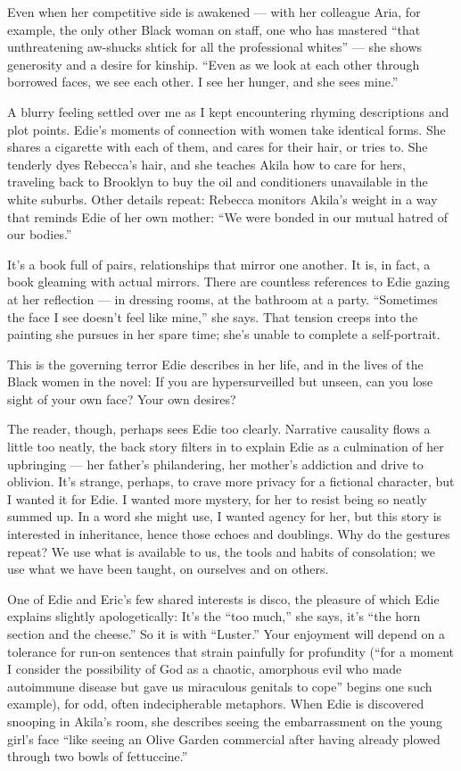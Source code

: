 Even when her competitive side is awakened --- with her colleague Aria,
for example, the only other Black woman on staff, one who has mastered
``that unthreatening aw-shucks shtick for all the professional whites''
--- she shows generosity and a desire for kinship. ``Even as we look at
each other through borrowed faces, we see each other. I see her hunger,
and she sees mine.''

A blurry feeling settled over me as I kept encountering rhyming
descriptions and plot points. Edie's moments of connection with women
take identical forms. She shares a cigarette with each of them, and
cares for their hair, or tries to. She tenderly dyes Rebecca's hair, and
she teaches Akila how to care for hers, traveling back to Brooklyn to
buy the oil and conditioners unavailable in the white suburbs. Other
details repeat: Rebecca monitors Akila's weight in a way that reminds
Edie of her own mother: ``We were bonded in our mutual hatred of our
bodies.''

It's a book full of pairs, relationships that mirror one another. It is,
in fact, a book gleaming with actual mirrors. There are countless
references to Edie gazing at her reflection --- in dressing rooms, at
the bathroom at a party. ``Sometimes the face I see doesn't feel like
mine,'' she says. That tension creeps into the painting she pursues in
her spare time; she's unable to complete a self-portrait.

This is the governing terror Edie describes in her life, and in the
lives of the Black women in the novel: If you are hypersurveilled but
unseen, can you lose sight of your own face? Your own desires?

The reader, though, perhaps sees Edie too clearly. Narrative causality
flows a little too neatly, the back story filters in to explain Edie as
a culmination of her upbringing --- her father's philandering, her
mother's addiction and drive to oblivion. It's strange, perhaps, to
crave more privacy for a fictional character, but I wanted it for Edie.
I wanted more mystery, for her to resist being so neatly summed up. In a
word she might use, I wanted agency for her, but this story is
interested in inheritance, hence those echoes and doublings. Why do the
gestures repeat? We use what is available to us, the tools and habits of
consolation; we use what we have been taught, on ourselves and on
others.

One of Edie and Eric's few shared interests is disco, the pleasure of
which Edie explains slightly apologetically: It's the ``too much,'' she
says, it's ``the horn section and the cheese.'' So it is with
``Luster.'' Your enjoyment will depend on a tolerance for run-on
sentences that strain painfully for profundity (``for a moment I
consider the possibility of God as a chaotic, amorphous evil who made
autoimmune disease but gave us miraculous genitals to cope'' begins one
such example), for odd, often indecipherable metaphors. When Edie is
discovered snooping in Akila's room, she describes seeing the
embarrassment on the young girl's face ``like seeing an Olive Garden
commercial after having already plowed through two bowls of
fettuccine.''

